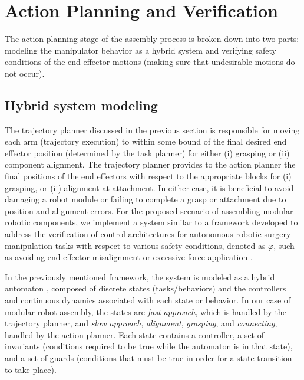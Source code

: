 \section{Action Planning and Verification}

The action planning stage of the assembly process is broken down into two parts: modeling the manipulator behavior as a hybrid system and verifying safety conditions of the end effector motions (making sure that undesirable motions do not occur).

\subsection{Hybrid system modeling}
The trajectory planner discussed in the previous section is responsible for moving each arm (trajectory execution) to within some bound of the final desired end effector position (determined by the task planner) for either (i) grasping or (ii) component alignment. 
The trajectory planner provides to the action planner the final positions of the end effectors with respect to the appropriate blocks for (i) grasping, or (ii) alignment at attachment.
In either case, it is beneficial to avoid damaging a robot module or failing to complete a grasp or attachment due to position and alignment errors.
For the proposed scenario of assembling modular robotic components, we implement a system similar to a framework developed to address the verification of control architectures for autonomous robotic surgery manipulation tasks with respect to various safety conditions, denoted as $\varphi$, such as avoiding end effector misalignment or excessive force application \cite{6016596}.

In the previously mentioned framework, the system is modeled as a hybrid automaton \cite{Alur1993}, composed of discrete states (tasks/behaviors) and the controllers and continuous dynamics associated with each state or behavior.
In our case of modular robot assembly, the states are \textit{fast approach}, which is handled by the trajectory planner, and \textit{slow approach}, \textit{alignment}, \textit{grasping}, and \textit{connecting}, handled by the action planner. 
Each state contains a controller, a set of invariants (conditions required to be true while the automaton is in that state), and a set of guards (conditions that must be true in order for a state transition to take place).

